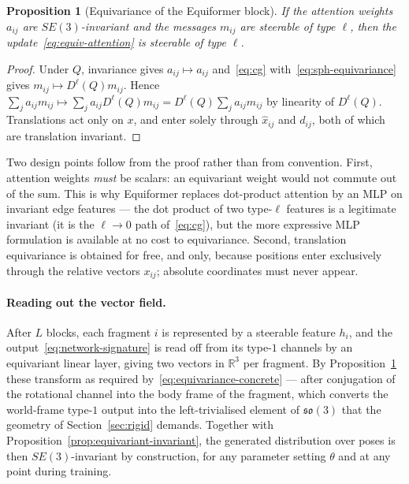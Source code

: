 \documentclass[a4paper,12pt]{article}
\newtheorem{proposition}[theorem]{Proposition}
\theoremstyle{remark}
\begin{document}
\begin{proposition}[Equivariance of the Equiformer block]
\label{prop:equiformer}
If the attention weights $a_{ij}$ are $SE(3)$-invariant and the messages $m_{ij}$ are
steerable of type $\ell$, then the update~\eqref{eq:equiv-attention} is steerable of type
$\ell$.
\end{proposition}

\begin{proof}
Under $Q$, invariance gives $a_{ij}\mapsto a_{ij}$ and~\eqref{eq:cg}
with~\eqref{eq:sph-equivariance} gives $m_{ij}\mapsto D^\ell(Q)m_{ij}$. Hence
$\sum_j a_{ij}m_{ij}\mapsto\sum_j a_{ij}D^\ell(Q)m_{ij}=D^\ell(Q)\sum_j a_{ij}m_{ij}$ by
linearity of $D^\ell(Q)$. Translations act only on $x$, and enter solely through
$\hat x_{ij}$ and $d_{ij}$, both of which are translation invariant.
\end{proof}

Two design points follow from the proof rather than from convention. First, attention
weights \emph{must} be scalars: an equivariant weight would not commute out of the sum.
This is why Equiformer replaces dot-product attention by an MLP on invariant edge
features --- the dot product of two type-$\ell$ features is a legitimate invariant (it is
the $\ell\to0$ path of~\eqref{eq:cg}), but the more expressive MLP formulation is
available at no cost to equivariance. Second, translation equivariance is obtained for
free, and only, because positions enter exclusively through the relative vectors
$x_{ij}$; absolute coordinates must never appear.

\paragraph{Reading out the vector field.}
After $L$ blocks, each fragment $i$ is represented by a steerable feature $h_i$, and the
output~\eqref{eq:network-signature} is read off from its type-$1$ channels by an
equivariant linear layer, giving two vectors in $\mathbb R^3$ per fragment. By
Proposition~\ref{prop:equiformer} these transform as required
by~\eqref{eq:equivariance-concrete} --- after conjugation of the rotational channel into
the body frame of the fragment, which converts the world-frame type-$1$ output into the
left-trivialised element of $\mathfrak{so}(3)$ that the geometry of
Section~\ref{sec:rigid} demands. Together with
Proposition~\ref{prop:equivariant-invariant}, the generated distribution over poses is
then $SE(3)$-invariant by construction, for any parameter setting $\theta$ and at any
point during training.
\end{document}

